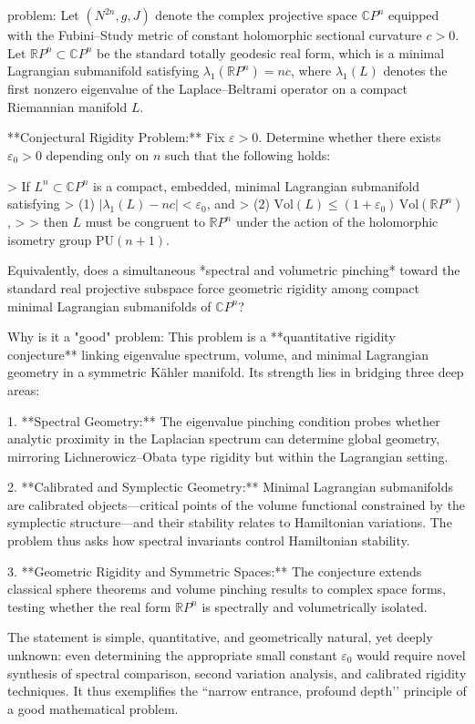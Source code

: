 problem:  
Let \( (N^{2n}, g, J) \) denote the complex projective space \( \mathbb{C}P^n \) equipped with the Fubini–Study metric of constant holomorphic sectional curvature \( c > 0 \).  
Let \( \mathbb{R}P^n \subset \mathbb{C}P^n \) be the standard totally geodesic real form, which is a minimal Lagrangian submanifold satisfying \( \lambda_1(\mathbb{R}P^n) = n c \), where \( \lambda_1(L) \) denotes the first nonzero eigenvalue of the Laplace–Beltrami operator on a compact Riemannian manifold \(L\).

**Conjectural Rigidity Problem:**  
Fix \( \varepsilon > 0 \). Determine whether there exists \( \varepsilon_0 > 0 \) depending only on \(n\) such that the following holds:  

> If \( L^n \subset \mathbb{C}P^n \) is a compact, embedded, minimal Lagrangian submanifold satisfying  
> (1) \( \big| \lambda_1(L) - n c \big| < \varepsilon_0 \), and  
> (2) \( \mathrm{Vol}(L) \le (1 + \varepsilon_0)\, \mathrm{Vol}(\mathbb{R}P^n) \),  
>  
> then \(L\) must be congruent to \(\mathbb{R}P^n\) under the action of the holomorphic isometry group \(\mathrm{PU}(n+1)\).  

Equivalently, does a simultaneous *spectral and volumetric pinching* toward the standard real projective subspace force geometric rigidity among compact minimal Lagrangian submanifolds of \(\mathbb{C}P^n\)?

Why is it a "good" problem:  
This problem is a **quantitative rigidity conjecture** linking eigenvalue spectrum, volume, and minimal Lagrangian geometry in a symmetric Kähler manifold.  
Its strength lies in bridging three deep areas:  

1. **Spectral Geometry:** The eigenvalue pinching condition probes whether analytic proximity in the Laplacian spectrum can determine global geometry, mirroring Lichnerowicz–Obata type rigidity but within the Lagrangian setting.  

2. **Calibrated and Symplectic Geometry:** Minimal Lagrangian submanifolds are calibrated objects—critical points of the volume functional constrained by the symplectic structure—and their stability relates to Hamiltonian variations. The problem thus asks how spectral invariants control Hamiltonian stability.  

3. **Geometric Rigidity and Symmetric Spaces:** The conjecture extends classical sphere theorems and volume pinching results to complex space forms, testing whether the real form \(\mathbb{R}P^n\) is spectrally and volumetrically isolated.  

The statement is simple, quantitative, and geometrically natural, yet deeply unknown: even determining the appropriate small constant \(\varepsilon_0\) would require novel synthesis of spectral comparison, second variation analysis, and calibrated rigidity techniques. It thus exemplifies the “narrow entrance, profound depth’’ principle of a good mathematical problem.